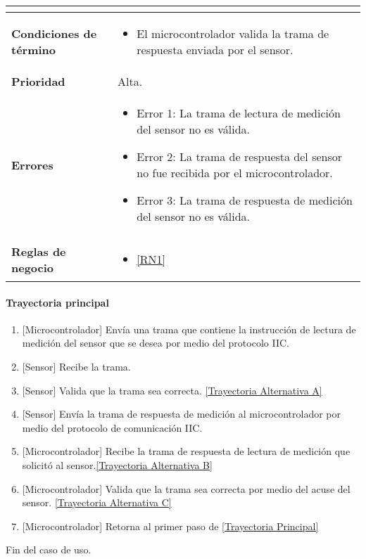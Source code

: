 \begin{longtable}{|J{5cm}|J{10.3cm}|}
\begin{itemize}
		\end{itemize} \\ \hline
	\textbf{Condiciones de término} & 
		\begin{itemize}
		    \item El microcontrolador valida la trama de respuesta enviada por el sensor.
		\end{itemize} 
		\\ \hline 
	\textbf{Prioridad} & 
		Alta. \\ \hline
	\textbf{Errores} &
		 \begin{itemize}
		 	\item \label{SUB-M-CU1.1:Error1} Error 1: La trama de lectura de medición del sensor no es válida.
		 	\item \label{SUB-M-CU1.1:Error2} Error 2: La trama de respuesta del sensor no fue recibida por el microcontrolador.
		 	\item \label{SUB-M-CU1.1:Error3} Error 3: La trama de respuesta de medición del sensor no es válida.
		 \end{itemize} \\ \hline
	\textbf{Reglas de negocio} & 
	    \begin{itemize}
	      \item  \ref{RN1}
		 \end{itemize}\\ \hline
\end{longtable}

\paragraph{Trayectoria principal}
\label{SUB-M-CU1.1:TP}
	\begin{enumerate}
	    \item {[Microcontrolador]} Envía una trama que contiene la instrucción de lectura de medición del sensor que se desea por medio del protocolo IIC.
	    \item {[Sensor]} Recibe la trama.
	    \item {[Sensor]} Valida que la trama sea correcta. \hyperref[SUB-M-CU1.1:TA]{[Trayectoria Alternativa A]} %
		\item {[Sensor]} Envía la trama de respuesta de medición al microcontrolador por medio del protocolo de comunicación IIC.
		\item {[Microcontrolador]} Recibe la trama de respuesta de lectura de medición que solicitó al sensor.\hyperref[SUB-M-CU1.1:TB]{[Trayectoria Alternativa B]} %
		\item {[Microcontrolador]} Valida que la trama sea correcta por medio del acuse del sensor. \hyperref[SUB-M-CU1.1:TC]{[Trayectoria Alternativa C]}%
		\item {[Microcontrolador]} Retorna al primer paso de \hyperref[SUB-M-CU1.1:TP]{[Trayectoria Principal]}
	\end{enumerate}
	Fin del caso de uso.

